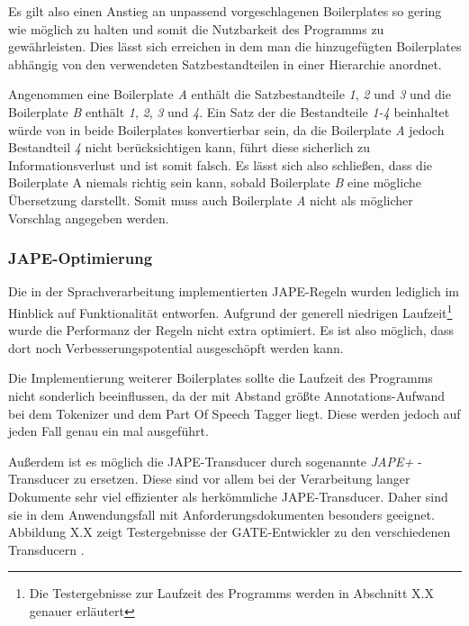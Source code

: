 \documentclass[12pt]{report}
\begin{document}
Es gilt also einen Anstieg an unpassend vorgeschlagenen Boilerplates so gering wie möglich zu halten und somit die Nutzbarkeit des Programms zu gewährleisten. Dies lässt sich erreichen in dem man die hinzugefügten Boilerplates abhängig von den verwendeten Satzbestandteilen in einer Hierarchie anordnet. 

Angenommen eine Boilerplate \textit{A} enthält die Satzbestandteile \textit{1}, \textit{2} und \textit{3} und die Boilerplate \textit{B} enthält \textit{1}, \textit{2}, \textit{3} und \textit{4}. Ein Satz der die Bestandteile \textit{1-4} beinhaltet würde von in beide Boilerplates konvertierbar sein, da die Boilerplate \textit{A} jedoch Bestandteil \textit{4} nicht berücksichtigen kann, führt diese sicherlich zu Informationsverlust und ist somit falsch. Es lässt sich also schließen, dass die Boilerplate A niemals richtig sein kann, sobald Boilerplate \textit{B} eine  mögliche Übersetzung darstellt. Somit muss auch Boilerplate \textit{A} nicht als möglicher Vorschlag angegeben werden. 
\subsubsection{JAPE-Optimierung}
Die in der Sprachverarbeitung implementierten JAPE-Regeln wurden lediglich im Hinblick auf Funktionalität entworfen. Aufgrund der generell niedrigen Laufzeit\footnote{Die Testergebnisse zur Laufzeit des Programms werden in Abschnitt X.X genauer erläutert} wurde die Performanz der Regeln nicht extra optimiert. Es ist also möglich, dass dort noch Verbesserungspotential ausgeschöpft werden kann. 

Die Implementierung weiterer Boilerplates sollte die Laufzeit des Programms nicht sonderlich beeinflussen, da der mit Abstand größte Annotations-Aufwand bei dem Tokenizer und dem Part Of Speech Tagger liegt. Diese werden jedoch auf jeden Fall genau ein mal ausgeführt. 

Außerdem ist es möglich die JAPE-Transducer durch sogenannte \textit{JAPE+} -Transducer zu ersetzen. Diese sind vor allem bei der Verarbeitung langer Dokumente sehr viel effizienter als herkömmliche JAPE-Transducer. Daher sind sie in dem Anwendungsfall mit Anforderungsdokumenten besonders geeignet. Abbildung X.X zeigt Testergebnisse der GATE-Entwickler zu den verschiedenen Transducern \cite{gm19}.
\end{document}
